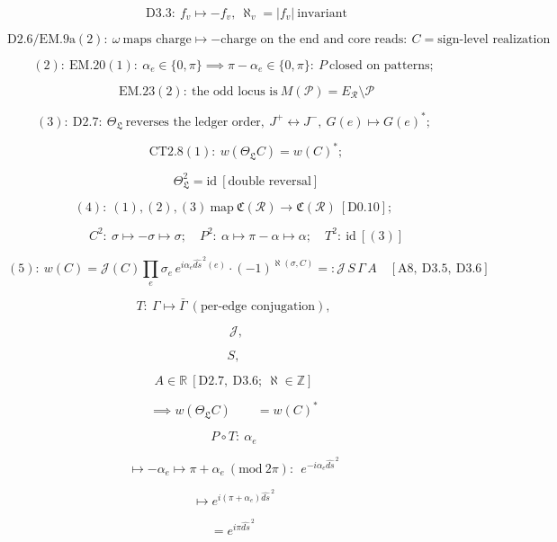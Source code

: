 \begin{theorem}
\[
\qquad \mathrm{D3.3}:\ f_v\mapsto-f_v,\ \aleph_v=|f_v|\ \text{invariant}
\]

\[
\mathrm{D2.6}/\mathrm{EM.9a}(2):\ \omega\ \text{maps charge}\mapsto-\text{charge on the end and core reads}:\ C=\text{sign-level realization}
\]

\[
(2):\ \mathrm{EM.20}(1):\ \alpha_e\in\{0,\pi\}\implies\pi-\alpha_e\in\{0,\pi\}:\ P\ \text{closed on patterns};
\]

\[
\qquad \mathrm{EM.23}(2):\ \text{the odd locus is}\ M(\mathcal P)=E_{\mathcal R}\setminus\mathcal P
\]

\[
(3):\ \mathrm{D2.7}:\ \Theta_{\mathfrak L}\ \text{reverses the ledger order},\ J^+\leftrightarrow J^-,\ G(e)\mapsto G(e)^\ast;
\]

\[
\qquad \mathrm{CT2.8}(1):\ w(\Theta_{\mathfrak L}C)=w(C)^\ast;
\]

\[
\qquad \Theta_{\mathfrak L}^2=\mathrm{id}\ [\text{double reversal}]
\]

\[
(4):\ (1),(2),(3)\ \text{map}\ \mathfrak C(\mathcal R)\to\mathfrak C(\mathcal R)\ [\mathrm{D0.10}];
\]

\[
\qquad C^2:\ \sigma\mapsto-\sigma\mapsto\sigma;\quad P^2:\ \alpha\mapsto\pi-\alpha\mapsto\alpha;\quad T^2:\ \mathrm{id}\ [(3)]
\]

\[
(5):\ w(C)=\mathcal J(C)\prod_{e}\sigma_e\,e^{i\alpha_e\widehat{ds}^{\,2}(e)}\cdot(-1)^{\aleph(\sigma,C)}=:\mathcal J\,S\,\Gamma\,A\quad[\mathrm{A8},\ \mathrm{D3.5},\ \mathrm{D3.6}]
\]

\[
T:\ \Gamma\mapsto\bar\Gamma\ (\text{per-edge conjugation}),
\]

\[
\ \ \mathcal J,
\]

\[
S,
\]

\[
A\in\mathbb R\ [\mathrm{D2.7},\ \mathrm{D3.6};\ \aleph\in\mathbb Z]
\]

\[
\implies w(\Theta_{\mathfrak L}C)\qquad = w(C)^\ast
\]

\[
P\circ T:\ \alpha_e
\]

\[
\mapsto -\alpha_e\mapsto\pi+\alpha_e\ (\mathrm{mod}\ 2\pi):\ \ e^{-i\alpha_e\widehat{ds}^{\,2}}
\]

\[
\mapsto e^{i(\pi+\alpha_e)\widehat{ds}^{\,2}}
\]

\[
= e^{i\pi\widehat{ds}^{\,2}}\,
\]


\end{theorem}
